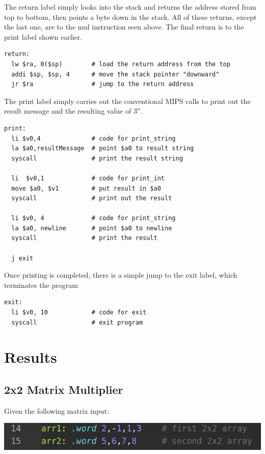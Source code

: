 \documentclass[twocolumn]{article}
\begin{document}
The return label simply looks into the stack and returns the address stored from top to bottom, then points a byte down in the stack. All of these returns, except the last one, are to the mul instruction seen above. The final return is to the print label shown earlier.

\begin{verbatim}
return:
  lw $ra, 0($sp)        # load the return address from the top 
  addi $sp, $sp, 4      # move the stack pointer "downward"
  jr $ra                # jump to the return address
\end{verbatim}

The print label simply carries out the conventional MIPS calls to print out the result message and the resulting value of $3^n$. 

\begin{verbatim}
print:
  li $v0,4              # code for print_string
  la $a0,resultMessage  # point $a0 to result string
  syscall               # print the result string 
  
  li  $v0,1             # code for print_int
  move $a0, $v1         # put result in $a0
  syscall               # print out the result
  
  li $v0, 4             # code for print_string
  la $a0, newline       # point $a0 to newline
  syscall               # print the result
  
  j exit
\end{verbatim}

Once printing is completed, there is a simple jump to the exit label, which terminates the program

\begin{verbatim}
exit:
  li $v0, 10            # code for exit
  syscall               # exit program
\end{verbatim}

\newpage

\section{Results}

\subsection{2x2 Matrix Multiplier}

Given the following matrix input: 

\begin{center}
  \includegraphics[scale=0.6]{Lab2-images/matmul2.png}
\end{center}
\end{document}
